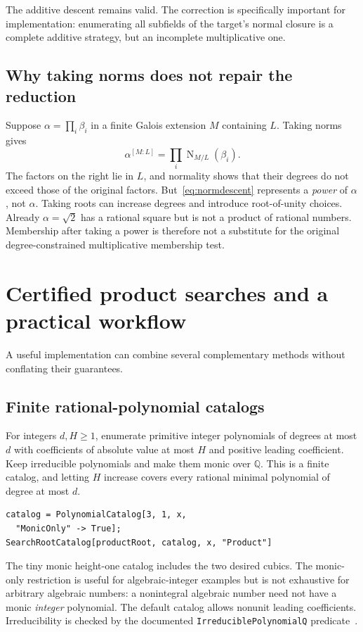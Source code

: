 \documentclass[11pt,letterpaper]{article}
\theoremstyle{definition}\newtheorem{definition}[theorem]{Definition}
\theoremstyle{remark}\newtheorem{remark}[theorem]{Remark}
\newcommand{\Q}{\mathbb Q}
\newcommand{\Norm}{\operatorname{N}}
\newcommand{\WL}[1]{\texttt{#1}}
\begin{document}
The additive descent remains valid. The correction is specifically important for implementation: enumerating all subfields of the target's normal closure is a complete additive strategy, but an incomplete multiplicative one.

\subsection{Why taking norms does not repair the reduction}
Suppose $\alpha=\prod_i\beta_i$ in a finite Galois extension $M$ containing $L$. Taking norms gives
\begin{equation}
 \alpha^{[M:L]}=\prod_i\Norm_{M/L}(\beta_i).
 \label{eq:normdescent}
\end{equation}
The factors on the right lie in $L$, and normality shows that their degrees do not exceed those of the original factors. But~\eqref{eq:normdescent} represents a \emph{power} of $\alpha$, not $\alpha$. Taking roots can increase degrees and introduce root-of-unity choices. Already $\alpha=\sqrt2$ has a rational square but is not a product of rational numbers. Membership after taking a power is therefore not a substitute for the original degree-constrained multiplicative membership test.

\section{Certified product searches and a practical workflow}
\label{sec:products}
A useful implementation can combine several complementary methods without conflating their guarantees.

\subsection{Finite rational-polynomial catalogs}
For integers $d,H\ge1$, enumerate primitive integer polynomials of degrees at most $d$ with coefficients of absolute value at most $H$ and positive leading coefficient. Keep irreducible polynomials and make them monic over $\Q$. This is a finite catalog, and letting $H$ increase covers every rational minimal polynomial of degree at most $d$.

\begin{lstlisting}
catalog = PolynomialCatalog[3, 1, x,
  "MonicOnly" -> True];
SearchRootCatalog[productRoot, catalog, x, "Product"]
\end{lstlisting}
The tiny monic height-one catalog includes the two desired cubics. The monic-only restriction is useful for algebraic-integer examples but is not exhaustive for arbitrary algebraic numbers: a nonintegral algebraic number need not have a monic \emph{integer} polynomial. The default catalog allows nonunit leading coefficients. Irreducibility is checked by the documented \WL{IrreduciblePolynomialQ} predicate~\cite{irreducible}.
\end{document}
